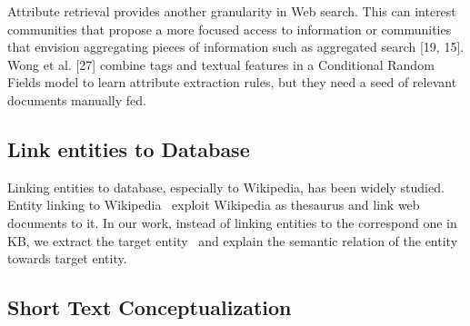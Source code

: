 Attribute retrieval provides another granularity in Web
search. This can interest communities that propose a more
focused access to information or communities that envision
aggregating pieces of information such as aggregated search
[19, 15].
Wong et al. [27]
combine tags and textual features in a Conditional Random
Fields model to learn attribute extraction rules, but they
need a seed of relevant documents manually fed.


\subsection{Link entities to Database}

Linking entities to database, especially to Wikipedia, has been widely studied. Entity linking to Wikipedia~\cite{milne2008learning,mihalcea2007wikify,han2011collective} exploit Wikipedia as thesaurus and link web documents to it.
In our work, instead of linking entities to the correspond one in KB, we extract the target entity~\cite{dalvi2011automatic} and explain the semantic relation of the entity towards target entity.


\subsection{Short Text Conceptualization}
